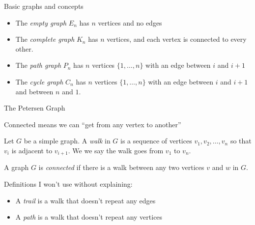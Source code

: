 \documentclass{beamer}
\begin{document}
\begin{frame}{Basic graphs and concepts}
  \begin{itemize}
  \item The \emph{empty graph} $E_n$ has $n$ vertices and no edges
  \item The \emph{complete graph} $K_n$ has $n$ vertices, and each vertex is connected to every other.
  \item The \emph{path graph} $P_n$ has $n$ vertices $\{1,\dots,n\}$ with an edge between $i$ and $i+1$
    \item The \emph{cycle graph} $C_n$ has $n$ vertices $\{1,\dots, n\}$ with an edge between $i$ and $i+1$ and between $n$ and $1$.
  \end{itemize}

  \begin{block}{The Petersen Graph}
\begin{center}
\end{center}
\end{block}
\end{frame}

\begin{frame}{Connected means we can ``get from any vertex to another''}
  \begin{definition}[Walk] Let $G$ be a simple graph.  A \emph{walk} in $G$ is a sequence of vertices $v_1, v_2, \dots, v_n$ so that $v_i$ is adjacent to $v_{i+1}$.  We we say the walk goes from $v_1$ to $v_n$.
    \end{definition}

  \begin{definition}[Connected] A graph $G$ is \emph{connected} if there is a walk between any two vertices $v$ and $w$ in $G$.
  \end{definition}

  \begin{block}{Definitions I won't use without explaining:}
    \begin{itemize}
    \item A \emph{trail} is a walk that doesn't repeat any edges
    \item A \emph{path} is a walk that doesn't repeat any vertices
    \end{itemize}
    \end{block}

\end{frame}
  
\end{document}
